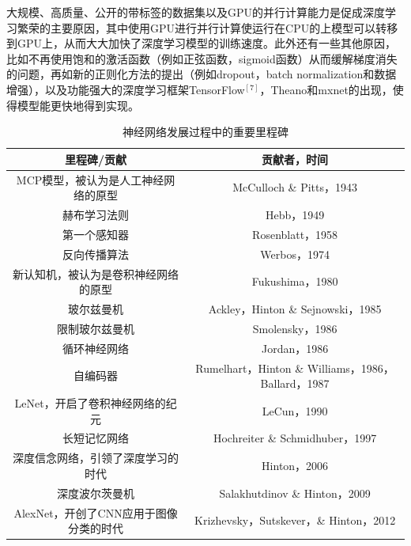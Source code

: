 \documentclass[a4paper]{article}
\begin{document}
大规模、高质量、公开的带标签的数据集以及GPU的并行计算能力是促成深度学习繁荣的主要原因，其中使用GPU进行并行计算使运行在CPU的上模型可以转移到GPU上，从而大大加快了深度学习模型的训练速度。此外还有一些其他原因，比如不再使用饱和的激活函数（例如正弦函数，sigmoid函数）从而缓解梯度消失的问题，再如新的正则化方法的提出（例如dropout，batch normalization和数据增强），以及功能强大的深度学习框架TensorFlow$^{[7]}$，Theano和mxnet的出现，使得模型能更快地得到实现。
\linespread{1.5}
\begin{table}
	\caption{神经网络发展过程中的重要里程碑}
	\begin{tabular}{cc}
		\toprule  %
		里程碑/贡献                            & 贡献者，时间                                       \\
		\midrule  %
		MCP模型，被认为是人工神经网络的原型    & McCulloch \& Pitts，1943                           \\
		赫布学习法则                           & Hebb，1949                                         \\
		第一个感知器                           & Rosenblatt，1958                                   \\
		反向传播算法                           & Werbos，1974                                       \\
		新认知机，被认为是卷积神经网络的原型   & Fukushima，1980                                    \\
		玻尔兹曼机                             & Ackley，Hinton \& Sejnowski，1985                  \\
		限制玻尔兹曼机                         & Smolensky，1986                                    \\
		循环神经网络                           & Jordan，1986                                       \\
		自编码器                               & Rumelhart，Hinton \& Williams，1986，Ballard，1987 \\
		LeNet，开启了卷积神经网络的纪元        & LeCun，1990                                        \\
		长短记忆网络                           & Hochreiter \& Schmidhuber，1997                    \\
		深度信念网络，引领了深度学习的时代     & Hinton，2006                                       \\
		深度波尔茨曼机                         & Salakhutdinov \& Hinton，2009                      \\
		AlexNet，开创了CNN应用于图像分类的时代 & Krizhevsky，Sutskever，\& Hinton，2012             \\
		\bottomrule %
	\end{tabular}
\end{table}
\end{document}
